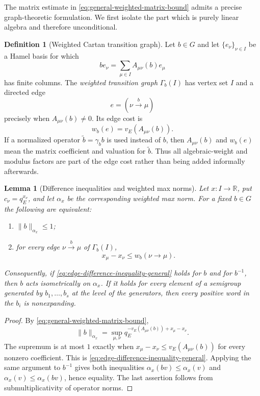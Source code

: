 \documentclass[12pt]{article}
\newtheorem{lemma}[theorem]{Lemma}
\theoremstyle{definition}
\newtheorem{definition}[theorem]{Definition}
\theoremstyle{remark}
\begin{document}
The matrix estimate in \eqref{eq:general-weighted-matrix-bound} admits a
precise graph-theoretic formulation.  We first isolate the part which is
purely linear algebra and therefore unconditional.

\begin{definition}[Weighted Cartan transition graph]
\label{def:weighted-Cartan-transition-graph}
Let $b\in G$ and let $\{e_\nu\}_{\nu\in I}$ be a Hamel basis for which
\[
 be_\nu=\sum_{\mu\in I}A_{\mu\nu}(b)e_\mu
\]
has finite columns.  The \emph{weighted transition graph} $\Gamma_b(I)$ has
vertex set $I$ and a directed edge
\[
 e=(\nu\xrightarrow{\,b\,}\mu)
\]
precisely when $A_{\mu\nu}(b)\neq0$.  Its edge cost is
\[
 w_b(e)=v_E\!\left(A_{\mu\nu}(b)\right).
\]
If a normalized operator $\widetilde b=\gamma_b b$ is used instead of $b$,
then $A_{\mu\nu}(b)$ and $w_b(e)$ mean the matrix coefficient and valuation
for $\widetilde b$.  Thus all algebraic-weight and modulus factors are part
of the edge cost rather than being added informally afterwards.
\end{definition}

\begin{lemma}[Difference inequalities and weighted max norms]
\label{lem:graph-potential-max-norm}
Let $x:I\to\mathbb R$, put $c_\nu=q_E^{x_\nu}$, and let $\alpha_x$ be the
corresponding weighted max norm.  For a fixed $b\in G$ the following are
equivalent:
\begin{enumerate}
 \item $\|b\|_{\alpha_x}\leq1$;
 \item for every edge $\nu\xrightarrow{b}\mu$ of $\Gamma_b(I)$,
 \begin{equation}\label{eq:edge-difference-inequality-general}
   x_\mu-x_\nu\leq w_b(\nu\to\mu).
 \end{equation}
\end{enumerate}
Consequently, if \eqref{eq:edge-difference-inequality-general} holds for
$b$ and for $b^{-1}$, then $b$ acts isometrically on $\alpha_x$.  If it
holds for every element of a semigroup generated by
$b_1,\ldots,b_s$ at the level of the generators, then every positive word in
the $b_i$ is nonexpanding.
\end{lemma}

\begin{proof}
By \eqref{eq:general-weighted-matrix-bound},
\[
 \|b\|_{\alpha_x}
 =\sup_{\mu,\nu}
 q_E^{-v_E(A_{\mu\nu}(b))+x_\mu-x_\nu}.
\]
The supremum is at most $1$ exactly when
$x_\mu-x_\nu\leq v_E(A_{\mu\nu}(b))$ for every nonzero coefficient.  This is
\eqref{eq:edge-difference-inequality-general}.  Applying the same argument
to $b^{-1}$ gives both inequalities
$\alpha_x(bv)\leq\alpha_x(v)$ and
$\alpha_x(v)\leq\alpha_x(bv)$, hence equality.  The last assertion follows
from submultiplicativity of operator norms.
\end{proof}
\end{document}

